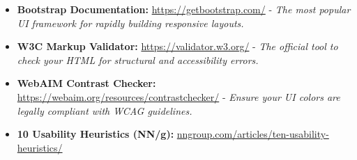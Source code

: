 \documentclass[a4paper,12pt]{article}
\begin{document}
\begin{itemize}
    \item \textbf{Bootstrap Documentation:} \href{https://getbootstrap.com/docs/5.3/getting-started/introduction/}{https://getbootstrap.com/} - \textit{The most popular UI framework for rapidly building responsive layouts.}
    \item \textbf{W3C Markup Validator:} \href{https://validator.w3.org/}{https://validator.w3.org/} - \textit{The official tool to check your HTML for structural and accessibility errors.}
    \item \textbf{WebAIM Contrast Checker:} \href{https://webaim.org/resources/contrastchecker/}{https://webaim.org/resources/contrastchecker/} - \textit{Ensure your UI colors are legally compliant with WCAG guidelines.}
    \item \textbf{10 Usability Heuristics (NN/g):} \href{https://www.nngroup.com/articles/ten-usability-heuristics/}{nngroup.com/articles/ten-usability-heuristics/}
\end{itemize}
\end{document}

